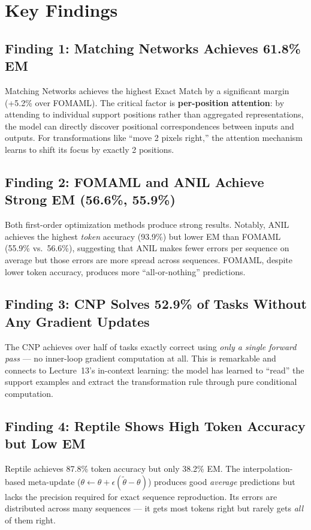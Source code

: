 \documentclass[11pt,a4paper]{article}
\begin{document}
\section{Key Findings}

\subsection{Finding 1: Matching Networks Achieves 61.8\% EM}
Matching Networks achieves the highest Exact Match by a significant margin (+5.2\% over FOMAML). The critical factor is \textbf{per-position attention}: by attending to individual support positions rather than aggregated representations, the model can directly discover positional correspondences between inputs and outputs. For transformations like ``move 2 pixels right,'' the attention mechanism learns to shift its focus by exactly 2 positions.

\subsection{Finding 2: FOMAML and ANIL Achieve Strong EM (56.6\%, 55.9\%)}
Both first-order optimization methods produce strong results. Notably, ANIL achieves the highest \emph{token} accuracy (93.9\%) but lower EM than FOMAML (55.9\% vs.\ 56.6\%), suggesting that ANIL makes fewer errors per sequence on average but those errors are more spread across sequences. FOMAML, despite lower token accuracy, produces more ``all-or-nothing'' predictions.

\subsection{Finding 3: CNP Solves 52.9\% of Tasks Without Any Gradient Updates}
The CNP achieves over half of tasks exactly correct using \emph{only a single forward pass} --- no inner-loop gradient computation at all. This is remarkable and connects to Lecture~13's in-context learning: the model has learned to ``read'' the support examples and extract the transformation rule through pure conditional computation.

\subsection{Finding 4: Reptile Shows High Token Accuracy but Low EM}
Reptile achieves 87.8\% token accuracy but only 38.2\% EM. The interpolation-based meta-update ($\theta \leftarrow \theta + \epsilon(\tilde{\theta} - \theta)$) produces good \emph{average} predictions but lacks the precision required for exact sequence reproduction. Its errors are distributed across many sequences --- it gets most tokens right but rarely gets \emph{all} of them right.
\end{document}
